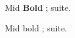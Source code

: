 \documentclass{article}
\begin{document}
Mid \textbf{Bold} ; suite.

Mid bold ; suite.
\end{document}
